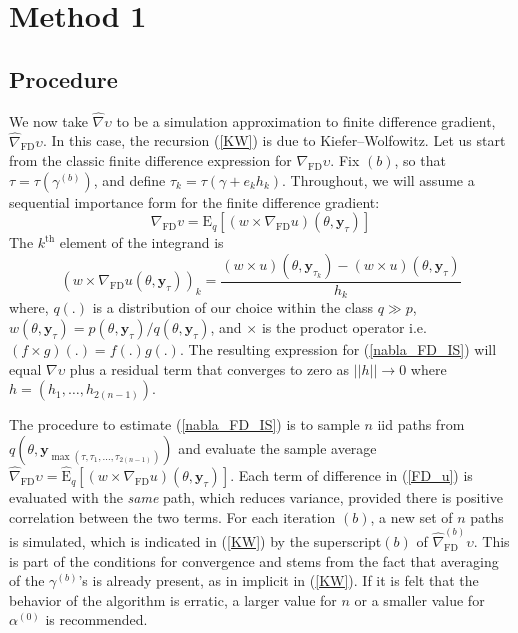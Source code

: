 \documentclass[11pt]{article}
\begin{document}
\section{Method 1}
\subsection{Procedure}
We now take $\widehat\nabla \upsilon$ to be a simulation
approximation to finite difference gradient,
$\widehat{\nabla}_{\mathrm{\scriptscriptstyle FD}} \upsilon$. In
this case, the recursion (\ref{KW}) is due to Kiefer--Wolfowitz. Let
us start from the classic finite difference expression for
$\nabla_{\mathrm{\scriptscriptstyle FD}} \upsilon$. Fix $(b)$, so
that $\tau=\tau(\gamma^{(b)})$, and define $\tau_k=\tau(\gamma+e_k
h_k)$. Throughout, we will assume a sequential importance form for
the finite difference gradient:
\begin{equation}\label{nabla_FD_IS}
\nabla_{\mathrm{\scriptscriptstyle FD}}v=\mathrm{E}_q[(w\times
\nabla_{\mathrm{\scriptscriptstyle FD}}
u)(\theta,\mathbf{y}_{\tau})]
\end{equation}
The $k^{\mathrm{th}}$ element of the integrand is
\begin{equation}\label{FD_u}
(w\times \nabla_\mathrm{\scriptscriptstyle FD}
u(\theta,\mathbf{y}_{\tau}))_k=\frac{(w\times
u)(\theta,\mathbf{y}_{\tau_k})-(w\times
u)(\theta,\mathbf{y}_{\tau})}{h_k}
\end{equation}where, $q(.)$ is a distribution of our
choice within the class $q\gg p$,
$w(\theta,\mathbf{y}_{\tau})=p(\theta,\mathbf{y}_{\tau})/q(\theta,\mathbf{y}_{\tau})$,
and $\times$ is the product operator i.e. $(f\times g)(.)=f(.)g(.)$.
The resulting expression for (\ref{nabla_FD_IS}) will equal $\nabla
\upsilon$ plus a residual term that converges to zero as
$||h||\rightarrow 0$ where $h=(h_1,\ldots,h_{2(n-1)})$.

The procedure to estimate (\ref{nabla_FD_IS}) is to sample $n$ iid
paths from
$q(\theta,\mathbf{y}_{\max(\tau,\tau_1,...,\tau_{2(n-1)})})$ and
evaluate the sample average
$\widehat{\nabla}_{\mathrm{\scriptscriptstyle FD}}
\upsilon=\widehat{\mathrm{E}}_q[(w\times
\nabla_{\mathrm{\scriptscriptstyle FD}}
u)(\theta,\mathbf{y}_{\tau})]$. Each term of difference in
(\ref{FD_u}) is evaluated with the \emph{same} path, which reduces
variance, provided there is positive correlation between the two
terms. For each iteration $(b)$, a new set of $n$ paths is
simulated, which is indicated in (\ref{KW}) by the superscript$(b)$
of $\widehat{\nabla}_{\mathrm{\scriptscriptstyle FD}}^{(b)}
\upsilon$. This is part of the conditions for convergence and stems
from the fact that averaging of the $\gamma^{(b)}$'s is already
present, as in implicit in (\ref{KW}). If it is felt that the
behavior of the algorithm is erratic, a larger value for $n$ or a
smaller value for $\alpha^{(0)}$ is recommended.
\end{document}
